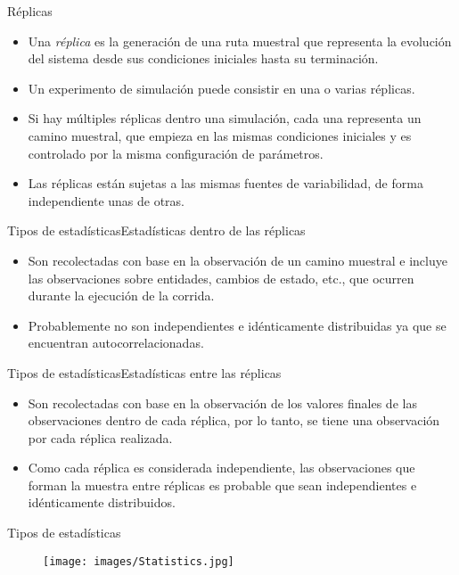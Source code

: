 \begin{frame}{Réplicas}
    \begin{itemize}
        \item Una \textit{réplica} es la generación de una ruta muestral que representa la evolución del sistema desde sus condiciones iniciales hasta su terminación.
        \item Un experimento de simulación puede consistir en una o varias réplicas.
        \item Si hay múltiples réplicas dentro una simulación, cada una representa un camino muestral, que empieza en las mismas condiciones iniciales y es controlado por la misma configuración de parámetros.
        \item Las réplicas están sujetas a las mismas fuentes de variabilidad, de forma independiente unas de otras. 
    \end{itemize}
\end{frame}

\begin{frame}{Tipos de estadísticas}{Estadísticas dentro de las réplicas}
    \begin{itemize}
        \item Son recolectadas con base en la observación de un camino muestral e incluye las observaciones sobre entidades, cambios de estado, etc., que ocurren durante la ejecución de la corrida.
        \item Probablemente no son independientes e idénticamente distribuidas ya que se encuentran autocorrelacionadas.
        
    \end{itemize}
\end{frame}

\begin{frame}{Tipos de estadísticas}{Estadísticas entre las réplicas}
    \begin{itemize}
        \item Son recolectadas con base en la observación de los valores finales de las observaciones dentro de cada réplica, por lo tanto, se tiene una observación por cada réplica realizada.
        \item Como cada réplica es considerada independiente, las observaciones que forman la muestra entre réplicas es probable que sean independientes e idénticamente distribuidos.
    \end{itemize}
\end{frame}

\begin{frame}{Tipos de estadísticas}
    \begin{figure}
        \centering
        \texttt{[image: images/Statistics.jpg]}
    \end{figure}
\end{frame}

